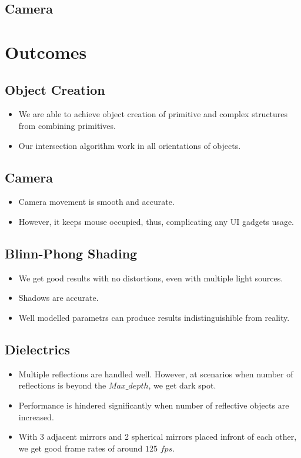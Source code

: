 \documentclass[a4paper]{article}
\begin{document}
\subsection{Camera}

\bigskip

\section{Outcomes}

\subsection{Object Creation}
\begin{itemize}
    \item We are able to achieve object creation of primitive and complex structures
    from combining primitives.

    \item Our intersection algorithm work in all orientations of objects.    
\end{itemize}

\subsection{Camera}
\begin{itemize}
    \item Camera movement is smooth and accurate.
    \item However, it keeps mouse occupied, thus, complicating any UI gadgets usage.
\end{itemize}

\subsection{Blinn-Phong Shading}
\begin{itemize}
    \item We get good results with no distortions, even with multiple light sources.
    \item Shadows are accurate. 
    \item Well modelled parametrs can produce results indistinguishible from reality.
\end{itemize}

\subsection{Dielectrics}
\begin{itemize}
    
    \item Multiple reflections are handled well. However, at scenarios when number of reflections is 
    beyond the $Max\_depth$, we get dark spot.

    \item Performance is hindered significantly when number of reflective objects are increased. 

    \item With 3 adjacent mirrors and 2 spherical mirrors placed infront of each other, we get good frame rates of around $125$ $fps$. 

\end{itemize}
\end{document}
